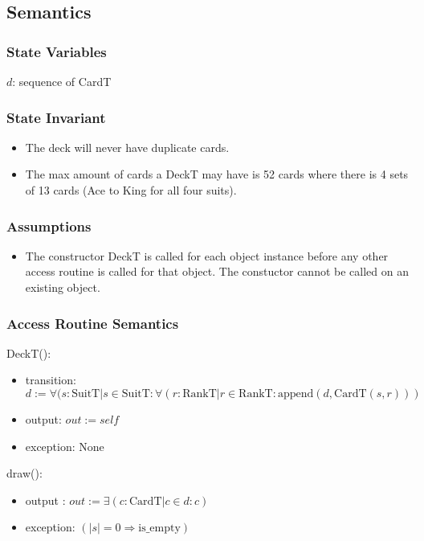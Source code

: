 \documentclass[12pt]{article}
\newcommand{\means}{\Rightarrow}
\begin{document}
\subsection* {Semantics}

\subsubsection* {State Variables}

$d$: sequence of CardT

\subsubsection* {State Invariant}

\begin{itemize}
  \item The deck will never have duplicate cards.
  \item The max amount of cards a DeckT may have is 52 cards where
  there is 4 sets of 13 cards (Ace to King for all four suits).
\end{itemize}

\subsubsection* {Assumptions}

\begin{itemize}
    \item The constructor DeckT is called for each object instance before
    any other access routine is called for that object. The constuctor
    cannot be called on an existing object.
\end{itemize}

\subsubsection* {Access Routine Semantics}

DeckT():
\begin{itemize}
    \item transition: $d := \forall (s : \mbox{SuitT} | s \in \mbox{SuitT} : \forall (r : \mbox{RankT} | r \in \mbox{RankT} : \mbox{append}(d,\mbox{CardT}(s,r)))$
    \item output: $out := \mathit{self}$
    \item exception: None
\end{itemize}

\noindent draw():
\begin{itemize}
    \item output : $out := \exists(c : \mbox{CardT} | c \in d : c)$
    \item exception: $(|s| = 0 \means \mbox{is\_empty})$
\end{itemize}
\end{document}
